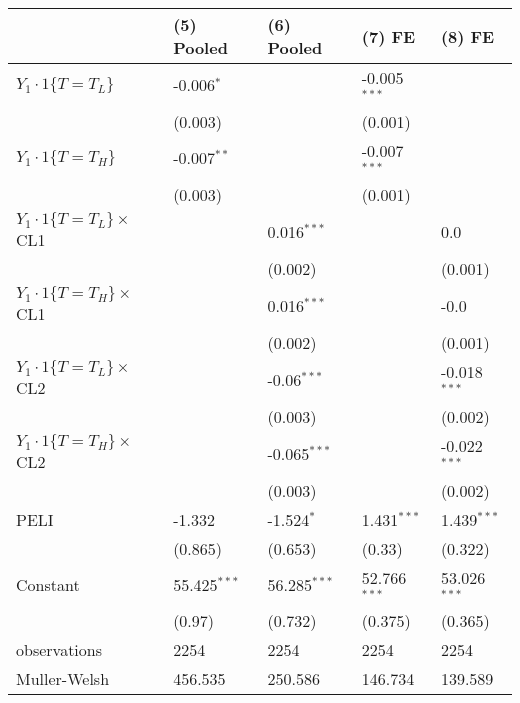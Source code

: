 \begin{tabular}{lllll}
\hline
 & (5) Pooled & (6) Pooled & (7) FE & (8) FE \\
\hline
$Y_1\cdot1\{T=T_L\}$ & -0.006$^{*}$ &  & -0.005$^{***}$ &  \\
 & (0.003) &  & (0.001) &  \\
$Y_1\cdot1\{T=T_H\}$ & -0.007$^{**}$ &  & -0.007$^{***}$ &  \\
 & (0.003) &  & (0.001) &  \\
$Y_1\cdot1\{T=T_L\}\times$CL1 &  & 0.016$^{***}$ &  & 0.0 \\
 &  & (0.002) &  & (0.001) \\
$Y_1\cdot1\{T=T_H\}\times$CL1 &  & 0.016$^{***}$ &  & -0.0 \\
 &  & (0.002) &  & (0.001) \\
$Y_1\cdot1\{T=T_L\}\times$CL2 &  & -0.06$^{***}$ &  & -0.018$^{***}$ \\
 &  & (0.003) &  & (0.002) \\
$Y_1\cdot1\{T=T_H\}\times$CL2 &  & -0.065$^{***}$ &  & -0.022$^{***}$ \\
 &  & (0.003) &  & (0.002) \\
PELI & -1.332 & -1.524$^{*}$ & 1.431$^{***}$ & 1.439$^{***}$ \\
 & (0.865) & (0.653) & (0.33) & (0.322) \\
Constant & 55.425$^{***}$ & 56.285$^{***}$ & 52.766$^{***}$ & 53.026$^{***}$ \\
 & (0.97) & (0.732) & (0.375) & (0.365) \\\hline

observations & 2254 & 2254 & 2254 & 2254 \\
Muller-Welsh & 456.535 & 250.586 & 146.734 & 139.589 \\
\hline
\end{tabular}
